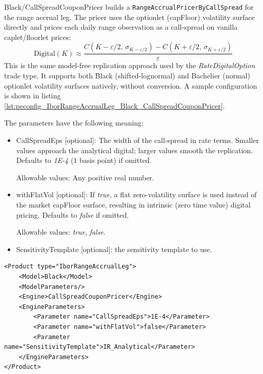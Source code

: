 Black/CallSpreadCouponPricer builds a \lstinline!RangeAccrualPricerByCallSpread! for the range accrual leg. The pricer
uses the optionlet (capFloor) volatility surface directly and prices each daily range observation as a call-spread on
vanilla caplet/floorlet prices:
$$\text{Digital}(K) \approx \frac{C(K - \varepsilon/2,\, \sigma_{K-\varepsilon/2}) - C(K + \varepsilon/2,\, \sigma_{K+\varepsilon/2})}{\varepsilon}$$
This is the same model-free replication approach used by the \emph{RateDigitalOption} trade type. It supports both
Black (shifted-lognormal) and Bachelier (normal) optionlet volatility surfaces natively, without conversion.
A sample configuration is shown in listing
\ref{lst:peconfig_IborRangeAccrualLeg_Black_CallSpreadCouponPricer}.

The parameters have the following meaning:

\begin{itemize}
\item CallSpreadEps [optional]: The width of the call-spread in rate terms. Smaller values approach the analytical
  digital; larger values smooth the replication. Defaults to \emph{1E-4} (1 basis point) if omitted.

  Allowable values: Any positive real number.

\item withFlatVol [optional]: If \emph{true}, a flat zero-volatility surface is used instead of the market capFloor
  surface, resulting in intrinsic (zero time value) digital pricing. Defaults to \emph{false} if omitted.

  Allowable values: \emph{true}, \emph{false}.

\item SensitivityTemplate [optional]: the sensitivity template to use.
\end{itemize}

\begin{longlisting}
\begin{verbatim}
<Product type="IborRangeAccrualLeg">
    <Model>Black</Model>
    <ModelParameters/>
    <Engine>CallSpreadCouponPricer</Engine>
    <EngineParameters>
        <Parameter name="CallSpreadEps">1E-4</Parameter>
        <Parameter name="withFlatVol">false</Parameter>
        <Parameter name="SensitivityTemplate">IR_Analytical</Parameter>
    </EngineParameters>
</Product>
\end{verbatim}
\caption{Configuration for Product IborRangeAccrualLeg, Model Black, Engine CallSpreadCouponPricer}
\label{lst:peconfig_IborRangeAccrualLeg_Black_CallSpreadCouponPricer}
\end{longlisting}

